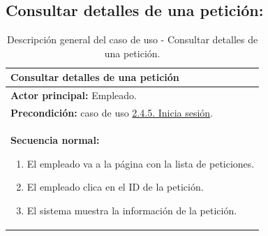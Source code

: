 \documentclass[12pt, a4paper, twoside]{report}
\begin{document}
        \subsection{Consultar detalles de una petición:}
        \label{subsec:2.4.6.}
            \begin{table}[H]
            \centering
            \begin{tabular}{|p{16cm}|} 
            \hline
            \textbf{Consultar detalles de una petición} \\ \hline
            \textbf{Actor principal:} Empleado. \\ \hline
            \textbf{Precondición:} caso de uso \hyperref[subsec:2.4.5.]{2.4.5. Inicia sesión}. \\ \hline
            \textbf{Secuencia normal:}
                \begin{enumerate}
                    \item El empleado va a la página con la lista de peticiones.
                    \item El empleado clica en el ID de la petición.
                    \item El sistema muestra la información de la petición.
                \end{enumerate} \\ \hline
            \end{tabular}
            \caption{Descripción general del caso de uso - Consultar detalles de una petición.}
            \end{table}
\end{document}
